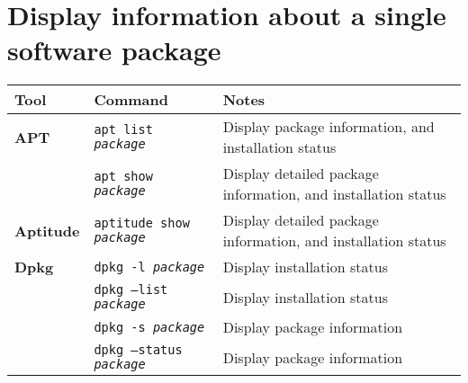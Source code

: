 \documentclass[10pt]{article}
\begin{document}
\section{Display information about a single software package}
\begin{tabular}{ p{3.5cm} p{9cm} p{11cm}}
  \hline
  \rowcolor{Gray}
  \textbf{Tool} & \textbf{Command} & \textbf{Notes} \\
  \hline 
  \textbf{APT} & \texttt{apt list \textit{package}} & Display package information, and installation status \\
  \rowcolor{Gray}
  & \texttt{apt show \textit{package}} & Display detailed package information, and installation status \\
  \textbf{Aptitude} & \texttt{aptitude show \textit{package}} &  Display detailed package information, and installation status \\
  \textbf{Dpkg} & \texttt{dpkg -l \textit{package} } & Display installation status \\
  \rowcolor{Gray}
  & \texttt{dpkg --list \textit{package} } & Display installation status \\
  & \texttt{dpkg -s \textit{package} } & Display package information\\
  \rowcolor{Gray}
  & \texttt{dpkg --status \textit{package} } & Display package information \\
  \hline
\end{tabular}
\end{document}
